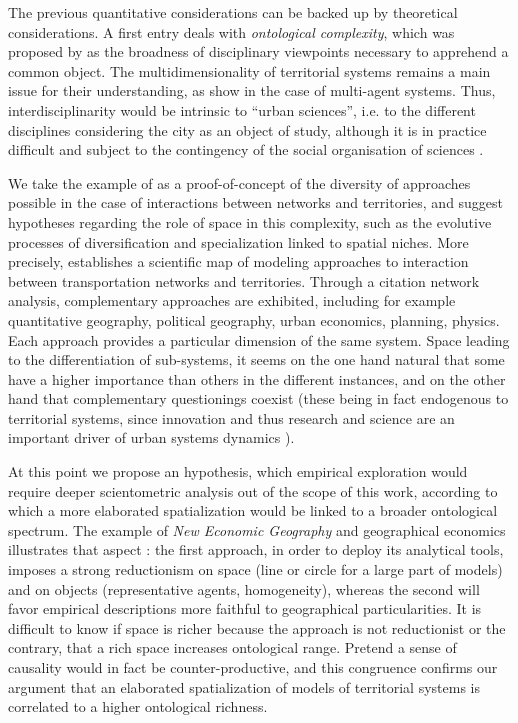 \documentclass[fleqn,10pt]{wlscirep}
\begin{document}
The previous quantitative considerations can be backed up by theoretical considerations. A first entry deals with \emph{ontological complexity}, which was proposed by \cite{pumain2003approche} as the broadness of disciplinary viewpoints necessary to apprehend a common object. The multidimensionality of territorial systems remains a main issue for their understanding, as show \cite{perez2016agent} in the case of multi-agent systems. Thus, interdisciplinarity would be intrinsic to ``urban sciences'', i.e. to the different disciplines considering the city as an object of study, although it is in practice difficult and subject to the contingency of the social organisation of sciences \cite{dupuy2015sciences}.


We take the example of \cite{raimbault2017invisible} as a proof-of-concept of the diversity of approaches possible in the case of interactions between networks and territories, and suggest hypotheses regarding the role of space in this complexity, such as the evolutive processes of diversification and specialization linked to spatial niches. More precisely, \cite{raimbault2017invisible} establishes a scientific map of modeling approaches to interaction between transportation networks and territories. Through a citation network analysis, complementary approaches are exhibited, including for example quantitative geography, political geography, urban economics, planning, physics. Each approach provides a particular dimension of the same system. Space leading to the differentiation of sub-systems, it seems on the one hand natural that some have a higher importance than others in the different instances, and on the other hand that complementary questionings coexist (these being in fact endogenous to territorial systems, since innovation and thus research and science are an important driver of urban systems dynamics \cite{pumain2010theorie}).


At this point we propose an hypothesis, which empirical exploration would require deeper scientometric analysis out of the scope of this work, according to which a more elaborated spatialization would be linked to a broader ontological spectrum. The example of \emph{New Economic Geography} and geographical economics illustrates that aspect \cite{marchionni2004geographical}: the first approach, in order to deploy its analytical tools, imposes a strong reductionism on space (line or circle for a large part of models) and on objects (representative agents, homogeneity), whereas the second will favor empirical descriptions more faithful to geographical particularities. It is difficult to know if space is richer because the approach is not reductionist or the contrary, that a rich space increases ontological range. Pretend a sense of causality would in fact be counter-productive, and this congruence confirms our argument that an elaborated spatialization of models of territorial systems is correlated to a higher ontological richness.
\end{document}

